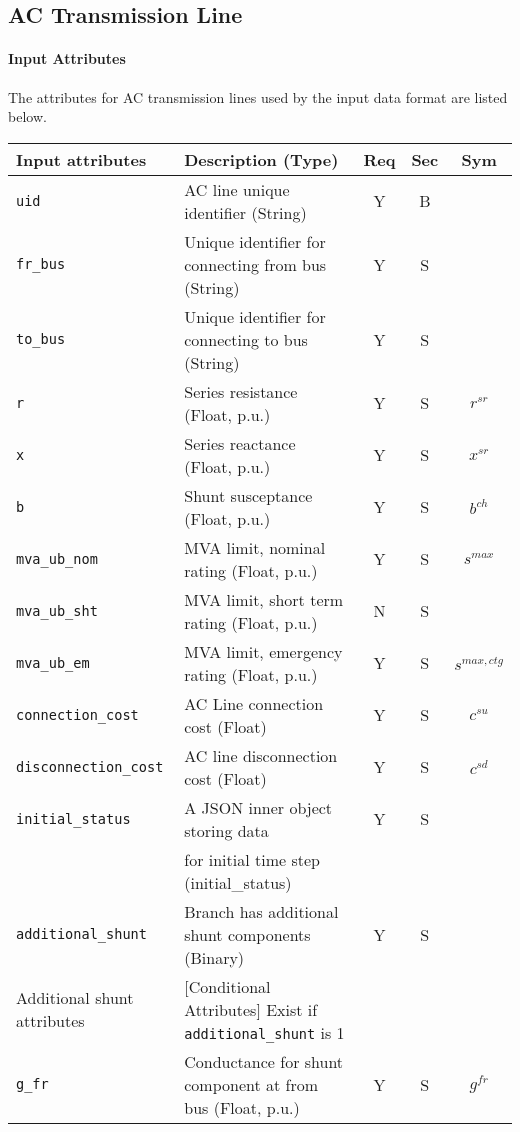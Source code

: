 \documentclass{article}
\begin{document}
\subsection{AC Transmission Line}
\label{nom:line}
\paragraph{Input Attributes}
The attributes for AC transmission lines used by the input data format are listed below.

\begin{center}
\small
\begin{tabular}{ l | l | c | c | c | }
Input attributes & Description (Type)& Req & Sec & Sym\\
\hline
  {\tt uid} & AC line unique identifier (String)& Y & B &  \\
  {\tt fr\_bus} & Unique identifier for connecting from bus (String)& Y & S & \\
  {\tt to\_bus} & Unique identifier for connecting to bus (String)& Y & S & \\
  {\tt r} & Series resistance (Float, p.u.)& Y & S & $r^{sr}$\\
  {\tt x} & Series reactance  (Float, p.u.)& Y & S & $x^{sr}$\\
  {\tt b} & Shunt susceptance (Float, p.u.)& Y & S & $b^{ch}$\\
  {\tt mva\_ub\_nom} & MVA limit, nominal rating (Float, p.u.)& Y & S & $s^{max}$\\
  {\tt mva\_ub\_sht} & MVA limit, short term rating (Float, p.u.)& N & S & \\
  {\tt mva\_ub\_em} & MVA limit, emergency rating (Float, p.u.)& Y & S & $s^{max,ctg}$\\
  {\tt connection\_cost} &    AC Line connection cost (Float) & Y & S & $c^{su}$\\
  {\tt disconnection\_cost} & AC line disconnection cost (Float) & Y & S & $c^{sd}$\\
  {\tt initial\_status} & A JSON inner object storing data  & Y & S &  \\
       & for initial time step (initial\_status) &  &  &  \\
  {\tt additional\_shunt} & Branch has additional shunt components (Binary)& Y & S & \\
  \hline
  Additional shunt attributes & [Conditional Attributes] Exist if {\tt additional\_shunt} is 1 &  & & \\
  \hline
  {\tt g\_fr} & Conductance for shunt component at from bus (Float, p.u.)& Y & S & $g^{fr}$\\

\end{tabular}
\end{center}
\end{document}
